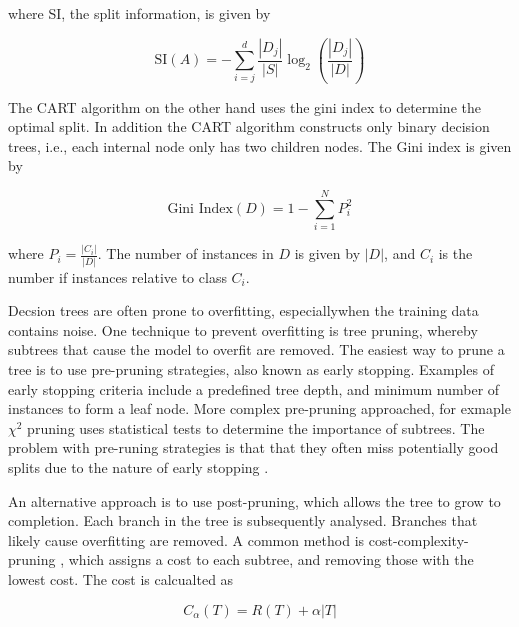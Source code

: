 \documentclass[conference]{IEEEtran}
\begin{document}
        where SI, the split information, is given by

        \begin{equation}
            \text{SI}(A) = - \sum_{i=j}^{d} \frac{|D_j|}{|S|} \log_2 \left( \frac{|D_j|}{|D|} \right)
        \end{equation}
            
        The CART algorithm \cite{DT_breiman1984classification} on the other hand uses the gini index to determine
        the optimal split. In addition the CART algorithm constructs only binary decision trees, i.e., each internal
        node only has two children nodes. The Gini index is given by 

        \begin{equation}
            \text{Gini Index}(D) = 1 - \sum_{i=1}^{N} P_i^2
        \end{equation}
            
        where $P_i = \frac{|C_i|}{|D|}$. The number of instances in $D$ is given by $|D|$, and $C_i$
        is the number if instances relative to class $C_i$.

        Decsion trees are often prone to overfitting, especiallywhen the training data contains noise.
        One technique to prevent overfitting is tree pruning, whereby subtrees that cause the model to overfit
        are removed. The easiest way to prune a tree is to use pre-pruning strategies, also known as early stopping.
        Examples of early stopping criteria include a predefined tree depth, and minimum number of instances to form
        a leaf node. More complex pre-pruning approached, for exmaple $\chi^2$ pruning uses statistical tests
        to determine the importance of subtrees. The problem with pre-runing strategies is that
        that they often miss potentially good splits due to the nature of early stopping \cite{Kelleher2015}.

        An alternative approach is to use post-pruning, which allows the tree to grow to completion. Each branch in the
        tree is subsequently analysed. Branches that likely cause overfitting are removed. A common method is
        cost-complexity-pruning \cite{Breiman1984}, which assigns a cost to each subtree, and removing those with the lowest cost.
        The cost is calcualted as

        \begin{equation}
            C_\alpha(T) = R(T) + \alpha |T|
        \end{equation}
            
\end{document}
